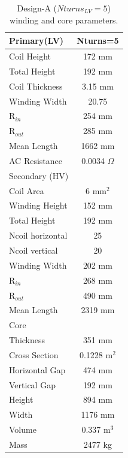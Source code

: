 \documentclass[a4paper, 11pt]{article} %
\begin{document}
\begin{table}[]
\begin{center}
\begin{tabular}{lc}
Primary(LV) & Nturns=5\\
\hline
Coil Height & 172 mm \\
Total Height & 192 mm \\
Coil Thickness & 3.15 mm\\
Winding Width & 20.75 \\
R$_{in}$ & 254 mm \\
R$_{out}$ & 285 mm \\
Mean Length & 1662 mm \\
AC Resistance & 0.0034 $\Omega$ \\
\hline
Secondary (HV) \\
Coil Area & 6 mm$^2$\\
Winding Height & 152 mm \\ 
Total Height & 192 mm \\
Ncoil horizontal & 25 \\
Ncoil vertical & 20 \\
Winding Width & 202 mm \\
R$_{in}$ & 268 mm \\
R$_{out}$ & 490 mm \\
Mean Length & 2319 mm \\
\hline
Core \\
Thickness & 351 mm \\
Cross Section & 0.1228 m$^2$\\
Horizontal Gap & 474 mm \\
Vertical Gap & 192 mm \\
Height & 894 mm \\
Width & 1176 mm \\
Volume & 0.337 m$^3$ \\
Mass & 2477 kg \\
\hline
\end{tabular} 
\end{center}
\caption{Design-A ($Nturns_{LV}=5$) winding and core parameters.}
\label{design_A}
\end{table}
\end{document}
